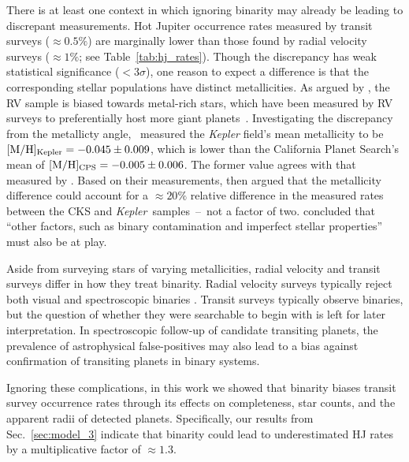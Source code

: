 \documentclass[12pt,modern]{aastex61}
\begin{document}
There is at least one context in which ignoring binarity may already be 
leading to discrepant measurements.
Hot Jupiter occurrence rates measured by transit surveys ($\approx 0.5\%$) are 
marginally lower than those found by radial velocity surveys ($\approx 1\%$; 
see Table~\ref{tab:hj_rates}).
Though the discrepancy has weak statistical significance ($<3\sigma$),
one reason to expect a difference is that the corresponding stellar 
populations have distinct metallicities.
As argued by \citet{gould_frequency_2006}, the RV sample is biased towards 
metal-rich stars, which have been measured by RV surveys to preferentially 
host more giant 
planets~\citep{santos_spectroscopic_2004,fischer_planet-metallicity_2005}.
Investigating the discrepancy from the metallicty 
angle,~\citet{guo_metallicity_2017} measured the
{\it Kepler} field's mean metallicity to be $[{\rm M/H}]_{\rm Kepler}= 
-0.045\pm0.009$, which is lower than the California Planet Search's mean of 
$[{\rm M/H}]_{\rm CPS}= -0.005\pm0.006$.
The former value agrees with that measured by \citet{dong_metallicities_2014}.
Based on their measurements, \citeauthor{guo_metallicity_2017}\! 
then argued that the metallicity difference could account for a $\approx 20\%$ 
relative difference in the measured rates between the CKS and {\it Kepler}\ 
samples~--~not a factor of two.
\citeauthor{guo_metallicity_2017}\! concluded that ``other factors, such as 
binary contamination and imperfect stellar properties'' must also be at play.

Aside from surveying stars of varying metallicities, radial velocity and 
transit surveys differ in how they treat binarity.
Radial velocity surveys typically reject both visual and spectroscopic binaries
\citep[\textit{e.g.},][]{wright_frequency_2012}.
Transit surveys typically observe binaries, but the question of whether they 
were searchable to begin with is left for later interpretation.
In spectroscopic follow-up of candidate transiting planets, the prevalence of 
astrophysical false-positives may also lead to a bias against confirmation of 
transiting planets in binary systems.

Ignoring these complications, in this work we showed that
binarity biases transit survey occurrence rates through its effects on 
completeness, star counts, and the apparent radii of detected planets.
Specifically, our results from Sec.~\ref{sec:model_3} indicate that binarity 
could lead to underestimated HJ rates by a multiplicative factor of $\approx 
1.3$.
\end{document}
